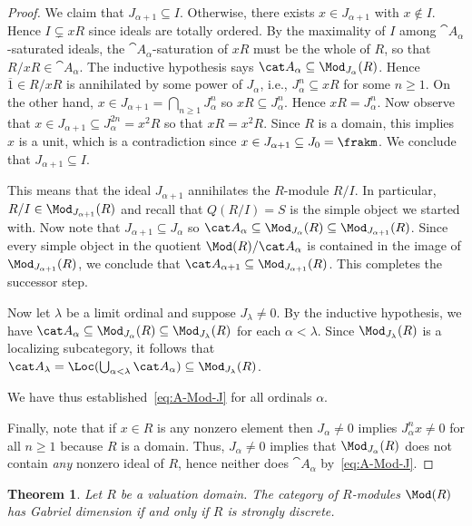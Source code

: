 \documentclass{amsart}
\numberwithin{equation}{section}%
\newtheorem{Thm}[equation]{Theorem}
\theoremstyle{remark}
\begin{document}
\begin{proof}
	We claim that $J_{\alpha +1} \subseteq I$. Otherwise, there exists $x \in J_{\alpha+1}$ with $x \not\in I$. Hence $I \subsetneq xR$ since ideals are totally ordered. By the maximality of $I$ among $\cat A_{\alpha}$-saturated ideals, the $\cat A_{\alpha}$-saturation of $xR$ must be the whole of $R$, so that $R/xR \in \cat A_{\alpha}$. The inductive hypothesis says $\cat A_\alpha \subseteq \Mod_{J_\alpha}(R)$. Hence $\overbar{1} \in R/xR$ is annihilated by some power of $J_\alpha$, i.e., $J_\alpha^n \subseteq xR$ for some $n \ge 1$. On the other hand, $x \in J_{\alpha + 1} = \bigcap_{n \ge 1} J_\alpha^n$ so $xR\subseteq J_\alpha^n$. Hence $xR = J_\alpha^n$. Now observe that $x \in J_{\alpha+1} \subseteq J_{\alpha}^{2n} = x^2 R$ so that $xR = x^2 R$. Since $R$ is a domain, this implies $x$ is a unit, which is a contradiction since $x \in J_{\alpha+1} \subseteq J_0 = \frakm$. We conclude that $J_{\alpha+1} \subseteq I$. 

	This means that the ideal $J_{\alpha+1}$ annihilates the $R$-module $R/I$. In particular, $R/I \in \Mod_{J_{\alpha+1}}(R)$ and recall that $Q(R/I)=S$ is the simple object we started with. Now note that $J_{\alpha+1} \subseteq J_\alpha$ so $\cat A_{\alpha} \subseteq \Mod_{J_\alpha}(R) \subseteq \Mod_{J_{\alpha+1}}(R)$. Since every simple object in the quotient $\Mod(R)/\cat A_{\alpha}$ is contained in the image of $\Mod_{J_{\alpha+1}}(R)$, we conclude that $\cat A_{\alpha + 1} \subseteq \Mod_{J_{\alpha+1}}(R)$. This completes the successor step.

	Now let $\lambda$ be a limit ordinal and suppose $J_\lambda \neq 0$.  By the inductive hypothesis, we have $\cat A_\alpha \subseteq \Mod_{J_\alpha}(R)\subseteq \Mod_{J_\lambda}(R)$ for each $\alpha < \lambda$. Since $\Mod_{J_\lambda}(R)$ is a localizing subcategory, it follows that $\cat A_{\lambda} = \Loc(\bigcup_{\alpha < \lambda} \cat A_{\alpha}) \subseteq \Mod_{J_\lambda}(R)$.

	We have thus established~\eqref{eq:A-Mod-J} for all ordinals $\alpha$.

	Finally, note that if $x \in R$ is any nonzero element then $J_\alpha\neq 0$ implies $J_\alpha^n x \neq 0$ for all $n \ge 1$ because $R$ is a domain. Thus, $J_\alpha \neq 0$ implies that $\Mod_{J_\alpha}(R)$ does not contain \emph{any} nonzero ideal of $R$, hence neither does $\cat A_{\alpha}$ by~\eqref{eq:A-Mod-J}.
\end{proof}

\begin{Thm}\label{thm:gabriel-dimension}
	Let $R$ be a valuation domain. The category of $R$-modules $\Mod(R)$ has Gabriel dimension if and only if $R$ is strongly discrete.
\end{Thm}
\end{document}
